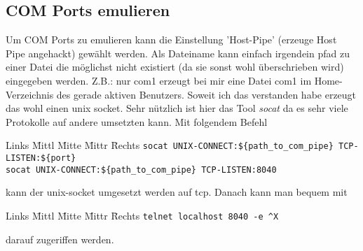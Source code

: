 \documentclass[12pt]{article}
\newenvironment{code}{\begin{tabbing}Links \= Mittl \= Mitte \= Mittr \= Rechts \kill}{\end{tabbing}}
\begin{document}
\subsection{COM Ports emulieren}
Um COM Ports zu emulieren kann die Einstellung 'Host-Pipe' (erzeuge Host Pipe angehackt)
gewählt werden. Als Dateiname kann einfach irgendein pfad zu einer Datei die möglichst nicht
existiert (da sie sonst wohl überschrieben wird) eingegeben werden.
Z.B.: nur com1 erzeugt bei mir eine Datei com1 im Home-Verzeichnis des gerade aktiven Benutzers.
Soweit ich das verstanden habe erzeugt das wohl einen unix socket. Sehr nützlich ist hier das Tool
\textit{socat} da es sehr viele Protokolle auf andere umsetzten kann. Mit folgendem Befehl
\begin{code}
	\> \verb#socat UNIX-CONNECT:${path_to_com_pipe} TCP-LISTEN:${port}# \\
	\> \verb#socat UNIX-CONNECT:${path_to_com_pipe} TCP-LISTEN:8040#
\end{code}
kann der unix-socket umgesetzt werden auf tcp. Danach kann man bequem mit
\begin{code}
	\> \verb#telnet localhost 8040 -e ^X#
\end{code}
darauf zugeriffen werden.
\end{document}
